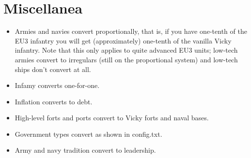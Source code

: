\documentclass[12pt]{article}
\begin{document}
\section{Miscellanea} 

\begin{itemize}
\item Armies and navies convert proportionally, that is, if you have
  one-tenth of the EU3 infantry you will get (approximately) one-tenth
  of the vanilla Vicky infantry. Note that this only applies to quite
  advanced EU3 units; low-tech armies convert to irregulars (still on
  the proportional system) and low-tech ships don't convert at all. 
\item Infamy converts one-for-one. 
\item Inflation converts to debt.
\item High-level forts and ports convert to Vicky forts and naval
  bases.  
\item Government types convert as shown in config.txt. 
\item Army and navy tradition convert to leadership. 
\end{itemize}
\end{document}

